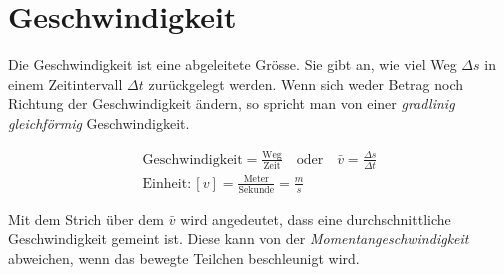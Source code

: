 \section{Geschwindigkeit}
Die Geschwindigkeit ist eine abgeleitete Grösse. Sie gibt an, wie viel Weg $\Delta s$ in einem Zeitintervall $\Delta t$
zurückgelegt werden.
Wenn sich weder Betrag noch Richtung der Geschwindigkeit ändern, so spricht man von einer \emph{gradlinig gleichförmig} Geschwindigkeit. 
\begin{cbox}
\begin{gather*}
	\text{Geschwindigkeit} = \frac{\text{Weg}}{\text{Zeit}}\quad\text{oder}\quad \bar{v}=\frac{\Delta s}{\Delta t}\\
		\text{Einheit}: [v] = \frac{\text{Meter}}{\text{Sekunde}}=\frac{\si{m}}{\si{s}}
\end{gather*}
\end{cbox}

Mit dem Strich über dem $\bar{v}$ wird angedeutet, dass eine durchschnittliche Geschwindigkeit
gemeint ist. Diese kann von der \emph{Momentangeschwindigkeit} abweichen, wenn das bewegte Teilchen beschleunigt wird.


